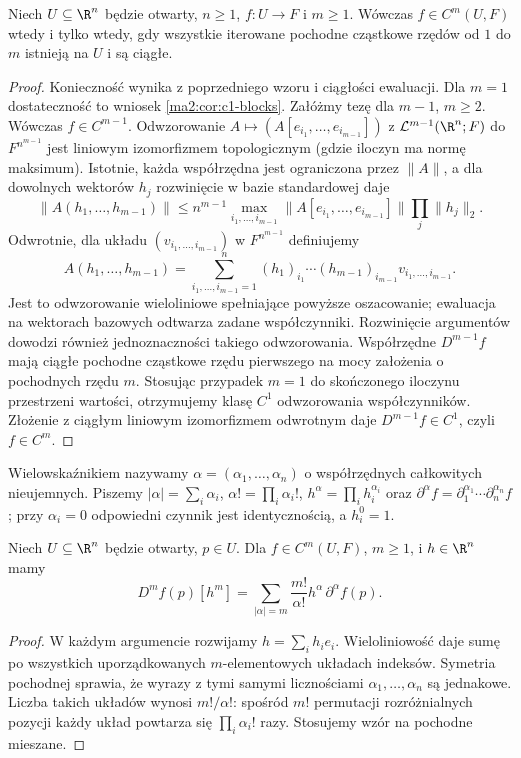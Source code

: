 \begin{twierdzenie}
\label{ma2:thm:ck-partials}
Niech $U\subseteq\R^n$ będzie otwarty, $n\ge1$,
$f:U\to F$ i $m\ge1$. Wówczas $f\in C^m(U,F)$
wtedy i tylko wtedy, gdy wszystkie iterowane
pochodne cząstkowe rzędów od $1$ do $m$ istnieją
na $U$ i są ciągłe.
\end{twierdzenie}
\begin{proof}
Konieczność wynika z poprzedniego wzoru i ciągłości
ewaluacji. Dla $m=1$ dostateczność to wniosek
\ref{ma2:cor:c1-blocks}. Załóżmy tezę dla $m-1$,
$m\ge2$. Wówczas $f\in C^{m-1}$.
Odwzorowanie $A\mapsto(A[e_{i_1},\ldots,e_{i_{m-1}}])$
z $\mathcal L^{m-1}(\R^n;F)$ do $F^{n^{m-1}}$
jest liniowym izomorfizmem topologicznym
(gdzie iloczyn ma normę maksimum).
Istotnie, każda współrzędna jest ograniczona przez
$\|A\|$, a dla dowolnych wektorów $h_j$ rozwinięcie
w bazie standardowej daje
\[
 \|A(h_1,\ldots,h_{m-1})\|
 \le n^{m-1}\max_{i_1,\ldots,i_{m-1}}\|A[e_{i_1},\ldots,e_{i_{m-1}}]\|
             \prod_j\|h_j\|_2.
\]
Odwrotnie, dla układu $(v_{i_1,\ldots,i_{m-1}})$
w $F^{n^{m-1}}$ definiujemy
\[
 A(h_1,\ldots,h_{m-1})=
 \sum_{i_1,\ldots,i_{m-1}=1}^n
 (h_1)_{i_1}\cdots(h_{m-1})_{i_{m-1}}v_{i_1,\ldots,i_{m-1}}.
\]
Jest to odwzorowanie wieloliniowe spełniające powyższe
oszacowanie; ewaluacja na wektorach bazowych odtwarza
zadane współczynniki. Rozwinięcie argumentów dowodzi
również jednoznaczności takiego odwzorowania.
Współrzędne $D^{m-1}f$ mają ciągłe pochodne
cząstkowe rzędu pierwszego na mocy założenia
o pochodnych rzędu $m$. Stosując przypadek $m=1$
do skończonego iloczynu przestrzeni wartości,
otrzymujemy klasę $C^1$ odwzorowania współczynników.
Złożenie z ciągłym liniowym izomorfizmem odwrotnym
daje $D^{m-1}f\in C^1$, czyli $f\in C^m$.
\end{proof}

\begin{definicja}[Wielowskaźnik]
\label{ma2:def:multiindex}
Wielowskaźnikiem nazywamy $\alpha=(\alpha_1,\ldots,\alpha_n)$
o współrzędnych całkowitych nieujemnych. Piszemy
$|\alpha|=\sum_i\alpha_i$, $\alpha!=\prod_i\alpha_i!$,
$h^\alpha=\prod_i h_i^{\alpha_i}$ oraz
$\partial^\alpha f=\partial_1^{\alpha_1}\cdots
\partial_n^{\alpha_n}f$; przy $\alpha_i=0$ odpowiedni
czynnik jest identycznością, a $h_i^0=1$.
\end{definicja}

\begin{wniosek}
\label{ma2:cor:multiindex-diagonal}
Niech $U\subseteq\R^n$ będzie otwarty, $p\in U$.
Dla $f\in C^m(U,F)$, $m\ge1$, i $h\in\R^n$ mamy
\[
 D^mf(p)[h^m]
 =\sum_{|\alpha|=m}\frac{m!}{\alpha!}
                  h^\alpha\,\partial^\alpha f(p).
\]
\end{wniosek}
\begin{proof}
W każdym argumencie rozwijamy $h=\sum_i h_ie_i$.
Wieloliniowość daje sumę po wszystkich uporządkowanych
$m$-elementowych układach indeksów. Symetria pochodnej
sprawia, że wyrazy z tymi samymi licznościami
$\alpha_1,\ldots,\alpha_n$ są jednakowe.
Liczba takich układów wynosi $m!/\alpha!$:
spośród $m!$ permutacji rozróżnialnych pozycji
każdy układ powtarza się $\prod_i\alpha_i!$ razy.
Stosujemy wzór na pochodne mieszane.
\end{proof}

